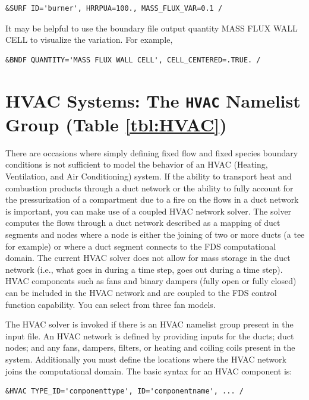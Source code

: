 \documentclass[11pt]{book}
\begin{document}
\begin{lstlisting}
&SURF ID='burner', HRRPUA=100., MASS_FLUX_VAR=0.1 /
\end{lstlisting}

It may be helpful to use the boundary file output quantity {\ct MASS FLUX WALL CELL} to visualize the variation.  For example,

\begin{lstlisting}
&BNDF QUANTITY='MASS FLUX WALL CELL', CELL_CENTERED=.TRUE. /
\end{lstlisting}


\section{HVAC Systems: The \texorpdfstring{{\tt HVAC}}{HVAC} Namelist Group (Table \ref{tbl:HVAC})}
\label{info:HVAC}

There are occasions where simply defining fixed flow and fixed species boundary conditions is not sufficient to model the behavior of an HVAC (Heating, Ventilation, and Air Conditioning) system.
If the ability to transport heat and combustion products through a duct network or the ability to fully account for the pressurization of a compartment
due to a fire on the flows in a duct network is important, you can make use of a coupled HVAC network solver.  The solver computes the flows through a
duct network described as a mapping of duct segments and nodes where a node is either the joining of two or more ducts (a tee for example) or where a duct segment connects to the FDS computational domain.
The current HVAC solver does not allow for mass storage in the duct network (i.e., what goes in during a time step, goes out during a time step).
HVAC components such as fans and binary dampers (fully open or fully closed) can be included in the HVAC network and are coupled to the FDS control function capability.  You can select from three fan models.

The HVAC solver is invoked if there is an {\ct HVAC} namelist group present in the input file.
An HVAC network is defined by providing inputs for the ducts; duct nodes; and any fans, dampers, filters, or heating and coiling coils present in the system.
Additionally you must define the locations where the HVAC network joins the computational domain.  The basic syntax for an {\ct HVAC} component is:

\begin{lstlisting}
&HVAC TYPE_ID='componenttype', ID='componentname', ... /
\end{lstlisting}
\end{document}

